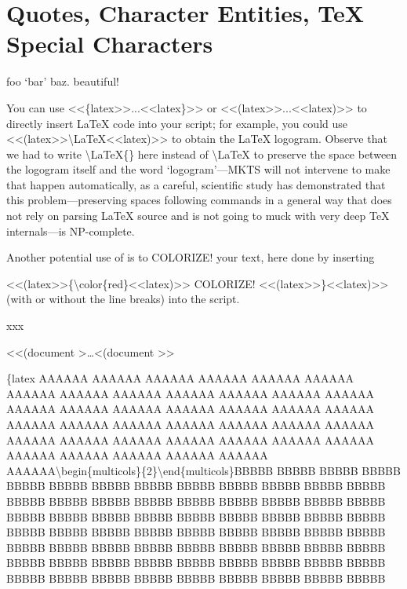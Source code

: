 \section{Quotes, Character Entities, TeX Special Characters
}
foo ‘bar’ baz.  beautiful!\mktsShowpar\par
\begin{multicols}{2}
You can use {\mktsStyleCode{}<<\{latex>>...<<latex\}>>} or {\mktsStyleCode{}<<(latex>>...<<latex)>>} to directly insert LaTeX
code into your script; for example, you could
use {\mktsStyleCode{}<<(latex>>\textbackslash{}LaTeX<<latex)>>}
to obtain the \LaTeX{} logogram.
Observe that we had to write {\mktsStyleCode{}\textbackslash{}LaTeX\{\}} here instead of {\mktsStyleCode{}\textbackslash{}LaTeX} to preserve the space between the logogram itself and
the word ‘logogram’—MKTS will not intervene to make that happen
automatically, as a careful, scientific study has demonstrated
that this problem—preserving spaces following commands in a
general way that does not rely on parsing \LaTeX{}
source and is not going to muck with very deep
\TeX{}
internals—is NP-complete.\mktsShowpar\par
Another potential use of  is to {\color{red}COLORIZE!} your text, here done by inserting\mktsShowpar\par
\begingroup\obeyalllines\mktsStyleCode{}<<(latex>>\{\textbackslash{}color\{red\}<<latex)>>
COLORIZE!
<<(latex>>\}<<latex)>>
\endgroup{}(with or without the line breaks) into the script.
\end{multicols}xxx\mktsShowpar\par
<<{\mktsStyleBold\color{violet}{\mktsStyleSymbol█}(document {\mktsStyleSymbol}}>…<{\mktsStyleBold\color{violet}{\mktsStyleSymbol█}(document {\mktsStyleSymbol}}>>\mktsShowpar\par
{\mktsStyleBold\color{violet}{\mktsStyleSymbol█}\{latex {\mktsStyleSymbol}}
AAAAAA AAAAAA AAAAAA AAAAAA AAAAAA AAAAAA AAAAAA AAAAAA AAAAAA AAAAAA AAAAAA AAAAAA
AAAAAA AAAAAA AAAAAA AAAAAA AAAAAA AAAAAA AAAAAA AAAAAA AAAAAA AAAAAA AAAAAA AAAAAA
AAAAAA AAAAAA AAAAAA AAAAAA AAAAAA AAAAAA AAAAAA AAAAAA AAAAAA AAAAAA AAAAAA AAAAAA
AAAAAA AAAAAA AAAAAA AAAAAA\textbackslash{}begin\{multicols\}\{2\}\textbackslash{}end\{multicols\}BBBBB BBBBB BBBBB BBBBB
BBBBB BBBBB BBBBB BBBBB BBBBB BBBBB BBBBB BBBBB BBBBB BBBBB BBBBB BBBBB BBBBB BBBBB BBBBB BBBBB BBBBB BBBBB BBBBB BBBBB BBBBB
BBBBB BBBBB BBBBB BBBBB BBBBB BBBBB BBBBB BBBBB BBBBB BBBBB BBBBB BBBBB BBBBB BBBBB BBBBB BBBBB BBBBB BBBBB BBBBB BBBBB BBBBB
BBBBB BBBBB BBBBB BBBBB BBBBB BBBBB BBBBB BBBBB BBBBB BBBBB BBBBB BBBBB BBBBB BBBBB BBBBB BBBBB BBBBB BBBBB BBBBB BBBBB BBBBB
